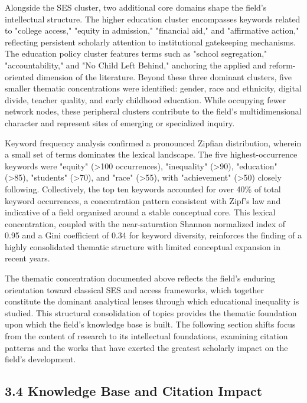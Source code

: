 \documentclass[12pt,a4paper]{article}
\begin{document}
Alongside the SES cluster, two additional core domains shape the field's intellectual structure. The higher education cluster encompasses keywords related to "college access," "equity in admission," "financial aid," and "affirmative action," reflecting persistent scholarly attention to institutional gatekeeping mechanisms. The education policy cluster features terms such as "school segregation," "accountability," and "No Child Left Behind," anchoring the applied and reform-oriented dimension of the literature. Beyond these three dominant clusters, five smaller thematic concentrations were identified: gender, race and ethnicity, digital divide, teacher quality, and early childhood education. While occupying fewer network nodes, these peripheral clusters contribute to the field's multidimensional character and represent sites of emerging or specialized inquiry.

Keyword frequency analysis confirmed a pronounced Zipfian distribution, wherein a small set of terms dominates the lexical landscape. The five highest-occurrence keywords were "equity" (>100 occurrences), "inequality" (>90), "education" (>85), "students" (>70), and "race" (>55), with "achievement" (>50) closely following. Collectively, the top ten keywords accounted for over 40\% of total keyword occurrences, a concentration pattern consistent with Zipf's law and indicative of a field organized around a stable conceptual core. This lexical concentration, coupled with the near-saturation Shannon normalized index of 0.95 and a Gini coefficient of 0.34 for keyword diversity, reinforces the finding of a highly consolidated thematic structure with limited conceptual expansion in recent years.

The thematic concentration documented above reflects the field's enduring orientation toward classical SES and access frameworks, which together constitute the dominant analytical lenses through which educational inequality is studied. This structural consolidation of topics provides the thematic foundation upon which the field's knowledge base is built. The following section shifts focus from the content of research to its intellectual foundations, examining citation patterns and the works that have exerted the greatest scholarly impact on the field's development.

\subsection{3.4 Knowledge Base and Citation Impact}
\end{document}
